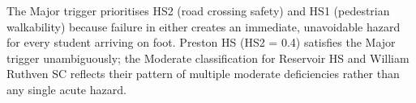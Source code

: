 \documentclass[11pt,a4paper]{article}
\begin{document}
The Major trigger prioritises HS2 (road crossing safety) and HS1 (pedestrian walkability) because failure in either creates an immediate, unavoidable hazard for every student arriving on foot. Preston HS (HS2 = 0.4) satisfies the Major trigger unambiguously; the Moderate classification for Reservoir HS and William Ruthven SC reflects their pattern of multiple moderate deficiencies rather than any single acute hazard.
\end{document}
